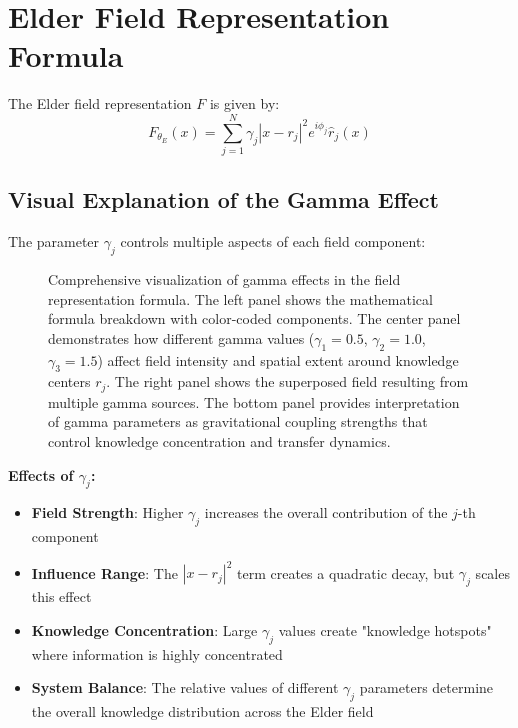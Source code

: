 \section{Elder Field Representation Formula}

The Elder field representation $F$ is given by:
\begin{equation}
F_{\theta_E}(x) = \sum_{j=1}^{N} \gamma_j |x - r_j|^2 e^{i\phi_j} \hat{r}_j(x)
\end{equation}

\subsection{Visual Explanation of the Gamma Effect}

The parameter $\gamma_j$ controls multiple aspects of each field component:

\begin{figure}[h]
\centering

\caption{Comprehensive visualization of gamma effects in the field representation formula. The left panel shows the mathematical formula breakdown with color-coded components. The center panel demonstrates how different gamma values ($\gamma_1 = 0.5$, $\gamma_2 = 1.0$, $\gamma_3 = 1.5$) affect field intensity and spatial extent around knowledge centers $r_j$. The right panel shows the superposed field resulting from multiple gamma sources. The bottom panel provides interpretation of gamma parameters as gravitational coupling strengths that control knowledge concentration and transfer dynamics.}
\label{fig:gamma_effects_field_representation}
\end{figure}

\textbf{Effects of $\gamma_j$:}
\begin{itemize}
    \item \textbf{Field Strength}: Higher $\gamma_j$ increases the overall contribution of the $j$-th component
    \item \textbf{Influence Range}: The $|x - r_j|^2$ term creates a quadratic decay, but $\gamma_j$ scales this effect
    \item \textbf{Knowledge Concentration}: Large $\gamma_j$ values create "knowledge hotspots" where information is highly concentrated
    \item \textbf{System Balance}: The relative values of different $\gamma_j$ parameters determine the overall knowledge distribution across the Elder field
\end{itemize}

